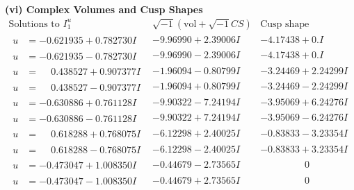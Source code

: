 \documentclass[1p]{elsarticle_modified}
\theoremstyle{definition}
\newcommand{\I}{\sqrt{-1}}
\begin{document}
\newpage\flushleft \textbf{(vi) Complex Volumes and Cusp Shapes}
$$\begin{array}{c|c|c}  
\text{Solutions to }I^u_{1}& \I (\text{vol} + \sqrt{-1}CS) & \text{Cusp shape}\\
 \hline 
\begin{aligned}
u &= -0.621935 + 0.782730 I\end{aligned}
 & -9.96990 + 2.39006 I & -4.17438 + 0. I\phantom{ +0.000000I} \\ \hline\begin{aligned}
u &= -0.621935 - 0.782730 I\end{aligned}
 & -9.96990 - 2.39006 I & -4.17438 + 0. I\phantom{ +0.000000I} \\ \hline\begin{aligned}
u &= \phantom{-}0.438527 + 0.907377 I\end{aligned}
 & -1.96094 - 0.80799 I & -3.24469 + 2.24299 I \\ \hline\begin{aligned}
u &= \phantom{-}0.438527 - 0.907377 I\end{aligned}
 & -1.96094 + 0.80799 I & -3.24469 - 2.24299 I \\ \hline\begin{aligned}
u &= -0.630886 + 0.761128 I\end{aligned}
 & -9.90322 - 7.24194 I & -3.95069 + 6.24276 I \\ \hline\begin{aligned}
u &= -0.630886 - 0.761128 I\end{aligned}
 & -9.90322 + 7.24194 I & -3.95069 - 6.24276 I \\ \hline\begin{aligned}
u &= \phantom{-}0.618288 + 0.768075 I\end{aligned}
 & -6.12298 + 2.40025 I & -0.83833 - 3.23354 I \\ \hline\begin{aligned}
u &= \phantom{-}0.618288 - 0.768075 I\end{aligned}
 & -6.12298 - 2.40025 I & -0.83833 + 3.23354 I \\ \hline\begin{aligned}
u &= -0.473047 + 1.008350 I\end{aligned}
 & -0.44679 - 2.73565 I & \phantom{-0.000000 } 0 \\ \hline\begin{aligned}
u &= -0.473047 - 1.008350 I\end{aligned}
 & -0.44679 + 2.73565 I & \phantom{-0.000000 } 0 \\ \hline\begin{aligned}

\end{aligned}
\end{array}$$
\end{document}
